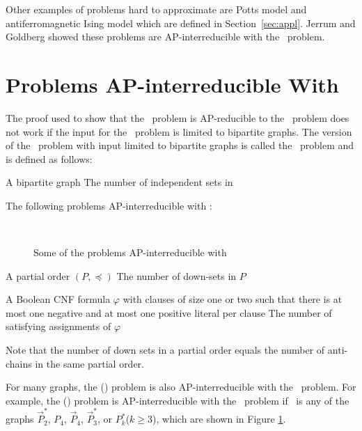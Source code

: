 Other examples of problems hard to approximate are Potts model
and antiferromagnetic Ising model which are defined in Section~\ref{sec:appl}. 
Jerrum and Goldberg \cite{Goldberg2007} showed these problems are 
AP-interreducible with the \csat\ problem.

\section{Problems AP-interreducible With \cbis}
The proof used to show that the \csat\ problem is AP-reducible to the \cis\ problem does
not work if the input for the \cis\ problem is limited to bipartite graphs.
The version of the \cis\ problem with input limited to bipartite graphs is called
the \cbis\ problem and is defined as follows:

\pnndef%
{A bipartite graph \mG}
{The number of independent sets in \mG}

The following problems AP-interreducible with \cbis:

\begin{figure}[h]
\centering
{}\hfill 
\subfigure[\ensuremath{P_4}]{\label{fig:p4}}\hfill
{}\\
{}\hfill
\subfigure[\ensuremath{P^*_k}]{\label{fig:psk}}
\caption{Some of the problems AP-interreducible with \cbis}
\label{fig:bisred}
\end{figure} 

\pdef{\cds}
{A partial order \((P,\preceq)\)}
{The number of down-sets in \(P\)}

{A Boolean CNF formula \(\varphi\) with clauses of size one or two such that
there is at most one negative and at most one positive literal per clause}
{The number of satisfying assignments of \(\varphi\)}

Note that the number of down sets in a partial order equals
the number of anti-chains in the same partial order. 

For many graphs, the \chom(\mH) problem is also AP-interreducible with the \cbis\ problem.
For example, the \chom(\mH) problem is AP-interreducible with the \cbis\ problem
if \mH\ is any of the graphs \(\vec{P}^*_2\), \(P_4\), \(\vec{P}_4\), \(\vec{P}^*_3\),
or \(P^*_k\)(\(k\ge 3\)), which are shown in Figure \ref{fig:bisred}\@.
 
